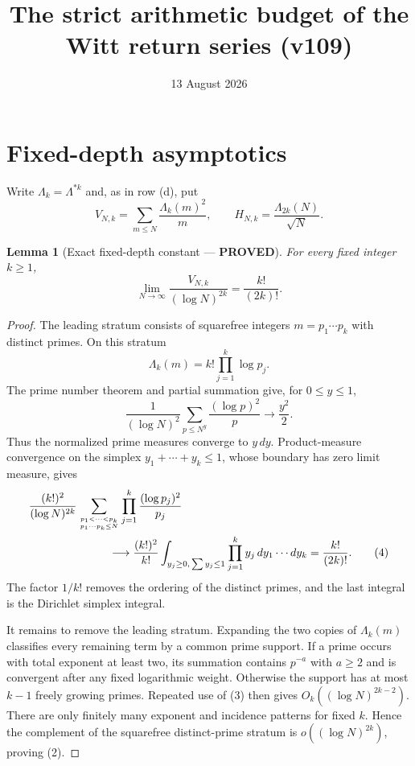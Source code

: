 \documentclass[11pt]{article}
\title{The strict arithmetic budget of the Witt return series (v109)}
\date{13 August 2026}
\newcommand{\PROVED}{\textcolor{green!40!black}{\textbf{PROVED}}}
\newtheorem{lemma}{Lemma}
\begin{document}
\maketitle

\section{Fixed-depth asymptotics}

Write $\Lambda_k=\Lambda^{*k}$ and, as in row (d), put
\begin{equation}
 V_{N,k}=\sum_{m\le N}\frac{\Lambda_k(m)^2}{m},
 \qquad H_{N,k}=\frac{\Lambda_{2k}(N)}{\sqrt N}.                \tag{1}
\end{equation}

\begin{lemma}[Exact fixed-depth constant --- \PROVED]
For every fixed integer $k\ge1$,
\begin{equation}
 \boxed{
 \lim_{N\to\infty}\frac{V_{N,k}}{(\log N)^{2k}}
       =\frac{k!}{(2k)!}.}                                    \tag{2}
\end{equation}
\end{lemma}

\begin{proof}
The leading stratum consists of squarefree integers
$m=p_1\cdots p_k$ with distinct primes.  On this stratum
\[
 \Lambda_k(m)=k!\prod_{j=1}^k\log p_j.
\]
The prime number theorem and partial summation give, for $0\le y\le1$,
\begin{equation}
 \frac1{(\log N)^2}\sum_{p\le N^y}\frac{(\log p)^2}{p}
       \longrightarrow\frac{y^2}{2}.                          \tag{3}
\end{equation}
Thus the normalized prime measures converge to $y\,dy$.  Product-measure
convergence on the simplex $y_1+\cdots+y_k\le1$, whose boundary has zero
limit measure, gives
\begin{align*}
 &\frac{(k!)^2}{(\log N)^{2k}}
 \sum_{p_1<\cdots<p_k\atop p_1\cdots p_k\le N}
       \prod_{j=1}^k\frac{(\log p_j)^2}{p_j}\\
 &\hspace{25mm}\longrightarrow
 \frac{(k!)^2}{k!}
 \int_{y_j\ge0,\,\sum y_j\le1}\prod_{j=1}^ky_j\,dy_1\cdots dy_k
 =\frac{k!}{(2k)!}.                                           \tag{4}
\end{align*}
The factor $1/k!$ removes the ordering of the distinct primes, and the last
integral is the Dirichlet simplex integral.

It remains to remove the leading stratum.  Expanding the two copies of
$\Lambda_k(m)$ classifies every remaining term by a common prime support.
If a prime occurs with total exponent at least two, its summation contains
$p^{-a}$ with $a\ge2$ and is convergent after any fixed logarithmic weight.
Otherwise the support has at most $k-1$ freely growing primes.  Repeated
use of (3) then gives $O_k((\log N)^{2k-2})$.  There are only finitely many
exponent and incidence patterns for fixed $k$.  Hence the complement of
the squarefree distinct-prime stratum is $o((\log N)^{2k})$, proving (2).
\end{proof}
\end{document}
